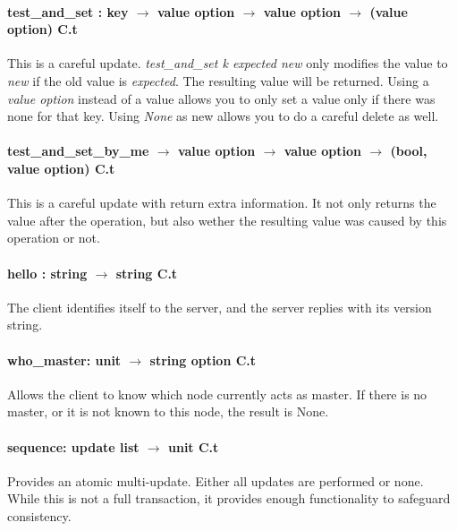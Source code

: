 \paragraph{test\_and\_set : key $\rightarrow$ value option $\rightarrow$ value option $\rightarrow$ (value option) C.t} This is a careful update.
\emph{test\_and\_set k expected new} only modifies the value to \emph{new} if the old value is \emph{expected}.
The resulting value will be returned.
Using a \emph{value option} instead of a value allows you to only set a value only if there was none for that key.
Using \emph{None} as new allows you to do a careful delete as well.
\paragraph{test\_and\_set\_by\_me $\rightarrow$ value option $\rightarrow$ value option $\rightarrow$ (bool, value option) C.t} 
This is a careful update with return extra information. 
It not only returns the value after the operation, 
but also wether the resulting value was caused by this operation or not.
\paragraph{hello : string $\rightarrow$ string C.t}
The client identifies itself to the server, and the server replies with its version string.
\paragraph{who\_master: unit $\rightarrow$ string option C.t}
Allows the client to know which node currently acts as master.
If there is no master, or it is not known to this node, the result is None.
%

\paragraph{sequence: update list $\rightarrow$ unit C.t}
Provides an atomic multi-update. Either all updates are performed or none. 
While this is not a full transaction, it provides enough functionality to safeguard consistency.
